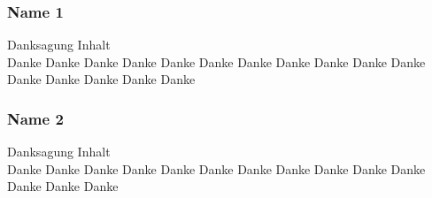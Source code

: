 \begin{acknowledgements}
\subsubsection*{Name 1}
Danksagung Inhalt
\\
Danke Danke Danke Danke Danke Danke Danke Danke Danke Danke Danke Danke Danke Danke Danke Danke 
\\                              %
\subsubsection*{Name 2}
Danksagung Inhalt
\\
Danke Danke Danke Danke Danke Danke Danke Danke Danke Danke Danke Danke Danke Danke 
\end{acknowledgements}
